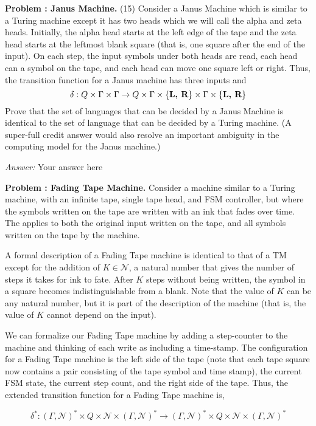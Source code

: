 \documentclass[11pt]{article}
\newenvironment{smallquote}{\vspace*{-2ex}\begin{list}{}{%
  \setlength\rightmargin{1.5em}\setlength\leftmargin{1.5em}\setlength\labelwidth{0pt}\setlength\itemindent{0pt}}\item[]}{\end{list}\vspace*{-1.3ex}}
\newcounter{problemno}
\newcommand{\problem}[1]{
   \stepcounter{problemno}
	 {\bf Problem \theproblemno: #1.}}
\newcommand{\answer}[1]{\par \bigskip \begin{smallquote}\emph{Answer:} #1\end{smallquote}}
\begin{document}
\problem{Janus Machine} (15) Consider a Janus Machine which is similar to a Turing machine except it has two heads which we will call the alpha and zeta heads.  Initially, the alpha head starts at the left edge of the tape and the zeta head starts at the leftmost blank square (that is, one square after the end of the input).  On each step, the input symbols under both heads are read, each head can a symbol on the tape, and each head can move one square left or right.  Thus, the transition function for a Janus machine has three inputs and 
\[
\delta: Q \times \Gamma \times \Gamma \rightarrow Q \times \Gamma \times \{ \text{\bf L, R} \} \times \Gamma \times \{ \text{\bf L, R} \}
\]
Prove that the set of languages that can be decided by a Janus Machine is identical to the set of language that can be decided by a Turing machine.  (A super-full credit answer would also resolve an important ambiguity in the computing model for the Janus machine.)

\answer{Your answer here}

\problem{Fading Tape Machine}  Consider a machine similar to a Turing machine, with an infinite tape, single tape head, and FSM controller, but where the symbols written on the tape are written with an ink that fades over time.  The applies to both the original input written on the tape, and all symbols written on the tape by the machine.  

A formal description of a Fading Tape machine is identical to that of a TM except for the addition of $K \in \mathcal{N}$, a natural number that gives the number of steps it takes for ink to fate.  After $K$ steps without being written, the symbol in a square becomes indistinguishable from a blank.   Note that the value of $K$ can be any natural number, but it is part of the description of the machine (that is, the value of $K$ cannot depend on the input).

We can formalize our Fading Tape machine by adding a step-counter to the machine and thinking of each write as including a time-stamp.  The configuration for a Fading Tape machine is the left side of the tape (note that each tape square now contains a pair consisting of the tape symbol and time stamp), the current FSM state, the current step count, and the right side of the tape.  Thus, the extended transition function for a Fading Tape machine is,

\[
\delta^{*}: (\Gamma, \mathcal{N})^{*} \times Q \times \mathcal{N} \times (\Gamma, \mathcal{N})^{*} \rightarrow (\Gamma, \mathcal{N})^{*} \times Q \times \mathcal{N} \times (\Gamma, \mathcal{N})^{*}
\]
\end{document}
